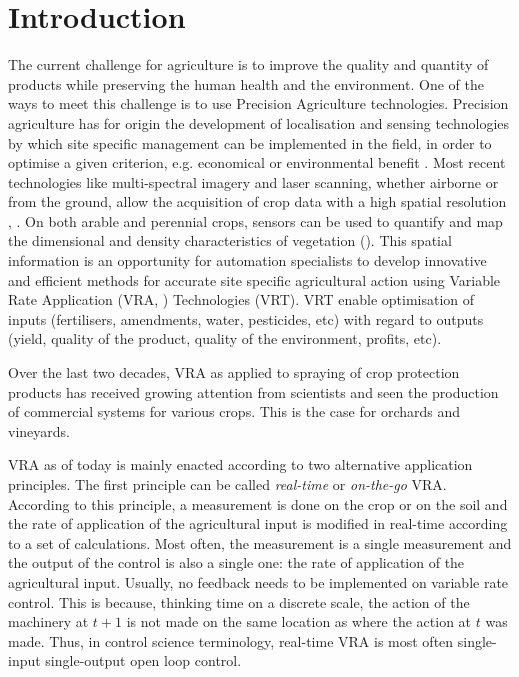 \documentclass[preprint,3p,times,twocolumn]{elsarticle}
\begin{document}
\section{Introduction}
\label{intro}
The current challenge for agriculture is to improve the quality and quantity of products while preserving the human health and the environment. One of the ways to meet this challenge is to use Precision Agriculture technologies. Precision agriculture has for origin the development of localisation and sensing technologies by which site specific management can be implemented in the field, in order to optimise a given criterion, e.g. economical or environmental benefit \cite{BERK2016273}. Most recent technologies like multi-spectral imagery and laser scanning, whether airborne or from the ground, allow the acquisition of crop data with a high spatial resolution \cite{rosell2009obtaining}, \cite{hall2003characterising}. On both arable and perennial crops, sensors can be used to quantify and map the dimensional and density characteristics of vegetation (\cite{Michaud200829}). This spatial information is an opportunity for automation specialists to develop innovative and efficient methods for accurate site specific agricultural action using Variable Rate Application (VRA, \cite{gil2007variable}) Technologies (VRT). VRT enable optimisation of inputs (fertilisers, amendments, water, pesticides, etc) with regard to outputs (yield, quality of the product, quality of the environment, profits, etc). 

Over the last two decades, VRA as applied to spraying of crop protection products has received growing attention from scientists and seen the production of commercial systems for various crops. This is the case for orchards and vineyards\cite{wandkar2018}.

VRA as of today is mainly enacted according to two alternative application principles. The first principle can be called \textit{real-time} or \textit{on-the-go} VRA. According to this principle, a measurement is done on the crop or on the soil and the rate of application of the agricultural input is modified in real-time according to a set of calculations. Most often, the measurement is a single measurement and the output of the control is also a single one: the rate of application of the agricultural input. Usually, no feedback needs to be implemented on variable rate control. This is because, thinking time on a discrete scale, the action of the machinery at $t+1$ is not made on the same location as where the action at $t$ was made. Thus, in control science terminology, real-time VRA is most often single-input single-output open loop control.
\end{document}
